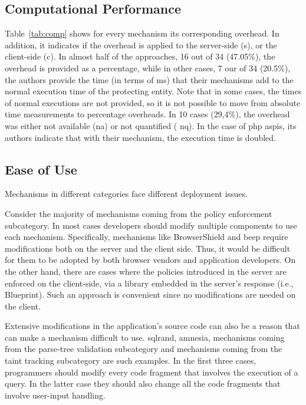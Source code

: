 \documentclass[conference]{IEEEtran}
\begin{document}
\subsection{Computational Performance}

Table~\ref{tab:comp} shows for every mechanism its corresponding
overhead. In addition, it indicates if the overhead is applied to the
server-side ({\sc s}), or the client-side ({\sc c}). In almost half of
the approaches, 16 out of 34 (47.05\%), the overhead is provided as a
percentage, while in other cases, 7 our of 34 (20.5\%), the authors
provide the time (in terms of ms) that their mechanisms add to the
normal execution time of the protecting entity. Note that in some
cases, the times of normal executions are not provided,
so it is not possible to move from absolute
time measurements to percentage overheads. In 10 cases (29,4\%), the
overhead was either not available ({\sc na}) or not quantified ({\sc
  nq}). In the case of {\sc php aspis}, its authors indicate that with
their mechanism, the execution time is doubled.

\subsection{Ease of Use}
\label{sec:deploy2}

Mechanisms in different categories face different deployment issues.

Consider the majority of mechanisms coming from the policy enforcement
subcategory. In most cases developers should modify multiple
components to use each mechanism. Specifically, mechanisms like
BrowserShield and {\sc beep} require modifications both on the server
and the client side. Thus, it would be difficult for them to be
adopted by both browser vendors and application developers. On the
other hand, there are cases where the policies introduced in the
server are enforced on the client-side, via a library embedded in the
server's response (i.e., Blueprint). Such an approach is convenient
since no modifications are needed on the client.

Extensive modifications in the application's source
code can also be a reason that can make a mechanism
difficult to use. {\sc sql}rand, {\sc amnesia},
mechanisms coming from the parse-tree validation
subcategory and mechanisms coming from the taint
tracking subcategory are such examples.
In the first three cases, programmers should modify every
code fragment that involves the execution of a query.
In the latter case they should also change
all the code fragments that involve user-input handling. 
\end{document}
